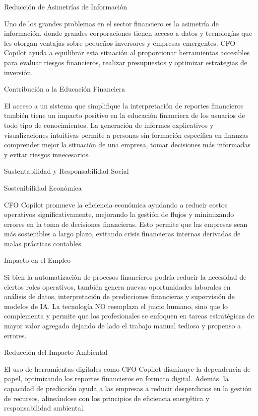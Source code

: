 \documentclass[12pt,letterpaper,oneside]{report}
\renewcommand{\_}{\UnderscoreOriginal\allowbreak}
\begin{document}
Reducción de Asimetrías de Información

Uno de los grandes problemas en el sector financiero es la asimetría de información, donde grandes corporaciones tienen acceso a datos y tecnologías que les otorgan ventajas sobre pequeños inversores y empresas emergentes. CFO Copilot ayuda a equilibrar esta situación al proporcionar herramientas accesibles para evaluar riesgos financieros, realizar presupuestos y optimizar estrategias de inversión.

Contribución a la Educación Financiera

El acceso a un sistema que simplifique la interpretación de reportes financieros también tiene un impacto positivo en la educación financiera de los usuarios de todo tipo de conocimientos. La generación de informes explicativos y visualizaciones intuitivas permite a personas sin formación específica en finanzas comprender mejor la situación de una empresa, tomar decisiones más informadas y evitar riesgos innecesarios.

Sustentabilidad y Responsabilidad Social

Sostenibilidad Económica

CFO Copilot promueve la eficiencia económica ayudando a reducir costos operativos significativamente, mejorando la gestión de flujos y minimizando errores en la toma de decisiones financieras. Esto permite que las empresas sean más sostenibles a largo plazo, evitando crisis financieras internas derivadas de malas prácticas contables.

Impacto en el Empleo

Si bien la automatización de procesos financieros podría reducir la necesidad de ciertos roles operativos, también genera nuevas oportunidades laborales en análisis de datos, interpretación de predicciones financieras y supervisión de modelos de IA. La tecnología NO reemplaza el juicio humano, sino que lo complementa y permite que los profesionales se enfoquen en tareas estratégicas de mayor valor agregado dejando de lado el trabajo manual tedioso y propenso a errores.

Reducción del Impacto Ambiental

El uso de herramientas digitales como CFO Copilot disminuye la dependencia de papel, optimizando los reportes financieros en formato digital. Además, la capacidad de predicción ayuda a las empresas a reducir desperdicios en la gestión de recursos, alineándose con los principios de eficiencia energética y responsabilidad ambiental.
\end{document}
